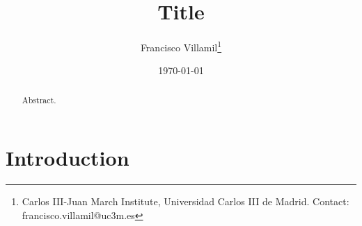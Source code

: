 \documentclass[12pt, notitlepage]{article}
\title{\Large Title}
\author{Francisco Villamil\footnote{Carlos III-Juan March Institute, Universidad Carlos III de Madrid. Contact: francisco.villamil@uc3m.es}}
\date{\today}
\begin{document}
\maketitle
\thispagestyle{empty}

\vspace{30pt}

\begin{abstract}

Abstract.

\end{abstract}

\newpage
\setcounter{page}{1}

\section*{Introduction}




% 
\end{document}
